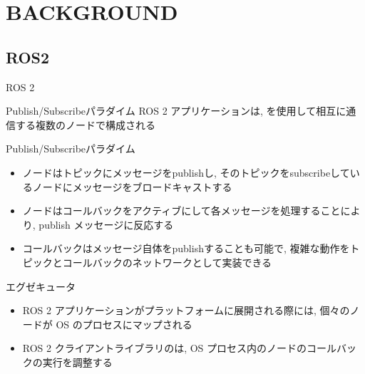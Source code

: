 

\section{BACKGROUND}
\label{sec: background}


\subsection{ROS2}
\label{ssec: ros2}

\begin{frame}{ROS 2}
\end{frame}

\begin{frame}{Publish/Subscribeパラダイム}
    ROS 2 アプリケーションは, を使用して相互に通信する複数のノードで構成される

    \begin{block}{Publish/Subscribeパラダイム}
        \setlength{\linewidth}{0.98\columnwidth}
        \begin{itemize}
            \item ノードはトピックにメッセージをpublishし, そのトピックをsubscribeしているノードにメッセージをブロードキャストする
            \item ノードはコールバックをアクティブにして各メッセージを処理することにより, publish メッセージに反応する
            \item コールバックはメッセージ自体をpublishすることも可能で, 複雑な動作をトピックとコールバックのネットワークとして実装できる
        \end{itemize}
    \end{block}
\end{frame}

\begin{frame}{エグゼキュータ}
    \begin{itemize}
        \item ROS 2 アプリケーションがプラットフォームに展開される際には, 個々のノードが OS のプロセスにマップされる
        \item ROS 2 クライアントライブラリのは, OS プロセス内のノードのコールバックの実行を調整する
    \end{itemize}
\end{frame}

